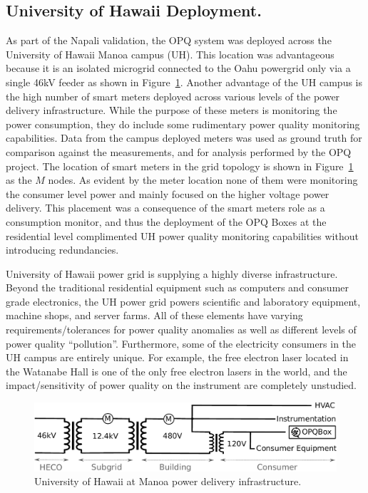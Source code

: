 \subsection{University of Hawaii Deployment.}\label{sec:university-of-hawaii-deployment.}

As part of the Napali validation, the OPQ system was deployed across the University of Hawaii Manoa campus (UH).
This location was advantageous because it is an isolated microgrid connected to the Oahu powergrid only via a single 46kV feeder as shown in Figure~\ref{expdes:fig:1}.
Another advantage of the UH campus is the high number of smart meters deployed across various levels of the power delivery infrastructure.
While the purpose of these meters is monitoring the power consumption, they do include some rudimentary power quality monitoring capabilities.
Data from the campus deployed meters was used as ground truth for comparison against the measurements, and for analysis performed by the OPQ project.
The location of smart meters in the grid topology is shown in Figure~\ref{expdes:fig:1} as the $M$ nodes.
As evident by the meter location none of them were monitoring the consumer level power and mainly focused on the higher voltage power delivery.
This placement was a consequence of the smart meters role as a consumption monitor, and thus the deployment of the OPQ Boxes at the residential level complimented UH power quality monitoring capabilities without introducing redundancies.

University of Hawaii power grid is supplying a highly diverse infrastructure.
Beyond the traditional residential equipment such as computers and consumer grade electronics, the UH power grid powers scientific and laboratory equipment, machine shops, and server farms.
All of these elements have varying requirements/tolerances for power quality anomalies as well as different levels of power quality ``pollution''.
Furthermore, some of the electricity consumers in the UH campus are entirely unique.
For example, the free electron laser located in the Watanabe Hall is one of the only free electron lasers in the world, and the impact/sensitivity of power quality on the instrument are completely unstudied.
\begin{figure}[h]
    \centering
    \includegraphics[width=1\linewidth]{img/uh-grid.pdf}
    \caption{University of Hawaii at Manoa power delivery infrastructure.}
    \label{expdes:fig:1}
\end{figure}


